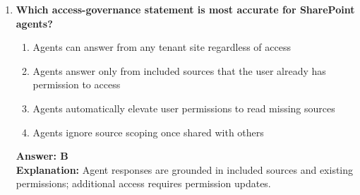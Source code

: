 \documentclass[10pt]{article}
\begin{document}
\begin{enumerate}[leftmargin=*]
\item \textbf{Which access-governance statement is most accurate for SharePoint agents?}
\begin{enumerate}[label=\Alph*.]
  \item Agents can answer from any tenant site regardless of access
  \item Agents answer only from included sources that the user already has permission to access
  \item Agents automatically elevate user permissions to read missing sources
  \item Agents ignore source scoping once shared with others
\end{enumerate}
\textbf{Answer: B}\\
\textbf{Explanation:} Agent responses are grounded in included sources and existing permissions; additional access requires permission updates.

\end{enumerate}

\clearpage
\end{document}
